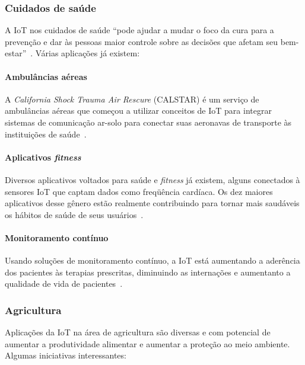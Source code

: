 \documentclass[pdftex, brazil, 12pt, twoside]{article}
\newcommand{\ingles}[1]{\textit{#1}}
\begin{document}
\subsubsection{Cuidados de saúde}
\label{aplicacoes-iot-exemplos-saude}

A IoT nos cuidados de saúde ``pode ajudar
a mudar o foco da cura para a prevenção e dar às pessoas maior controle sobre
as decisões que afetam seu bem-estar''~\citep[][p.\ 29]{UKGOSWalportIoT2014}.
Várias aplicações já existem:

\paragraph{Ambulâncias aéreas} A \ingles{California Shock Trauma Air Rescure} (CALSTAR)
é um serviço de ambulâncias aéreas que começou a utilizar conceitos de IoT para
integrar sistemas de comunicação ar-solo para conectar suas aeronavas de
transporte às instituições de saúde~\citep{CiscoCALSTAR}.

\paragraph{Aplicativos \emph{fitness}} Diversos aplicativos voltados para saúde
e \emph{fitness} já existem, alguns conectados à sensores IoT que captam
dados como freqüência cardíaca. Os dez maiores aplicativos desse gênero
estão realmente contribuindo para tornar mais saudáveis os hábitos
de saúde de seus usuários~\citep{OliverWymanIoT2015}.

\paragraph{Monitoramento contínuo} Usando soluções de monitoramento contínuo,
a IoT está aumentando a aderência dos pacientes às terapias prescritas, diminuindo
as internações e aumentanto a qualidade de vida de pacientes~\citep{McKinseyIoTHype}.


\subsubsection{Agricultura}
\label{aplicacoes-iot-exemplos-agricultura}

Aplicações da IoT na área de agricultura são diversas e com potencial de aumentar
a produtividade alimentar e aumentar a proteção ao meio ambiente. Algumas
iniciativas interessantes:
\end{document}
